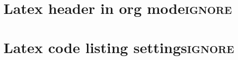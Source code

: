 \documentclass[11pt]{article}
\date{\today}
\title{}
\begin{document}
\tableofcontents

\section{Latex header in org mode\hfill{}\textsc{ignore}}
\label{sec:orgd551988}
\setlength\parindent{0pt}




\section{Latex code listing settings\hfill{}\textsc{ignore}}
\label{sec:org465d2f3}
\renewcommand{\arraystretch}{2}
\renewcommand{\footrulewidth}{0.4pt}%
\newpage
\end{document}
